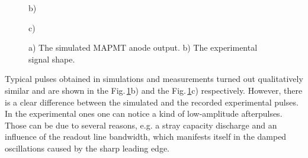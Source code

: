 \documentclass{webofc}
\begin{document}
\begin{figure}[h]
	\begin{minipage}[h]{0.45\linewidth}
		 b) \\
	\end{minipage}
	\hfill
	\begin{minipage}[h]{0.45\linewidth}
		 c) \\
	\end{minipage}
	\caption{ a) The simulated MAPMT anode output. b) The experimental signal shape.}
	\label{ris:sim}
\end{figure}
Typical pulses obtained in simulations and measurements turned out qualitatively similar and are shown in the Fig.\,\ref{ris:sim}b) and the Fig.\,\ref{ris:sim}c) respectively. However, there is a clear difference between the simulated and the recorded experimental pulses. In the experimental ones one can notice a kind of low-amplitude afterpulses. Those can be due to several reasons, e.g. a stray capacity discharge and an influence of the readout line bandwidth, which manifests itself in the damped oscillations caused by the sharp leading edge.
\end{document}
